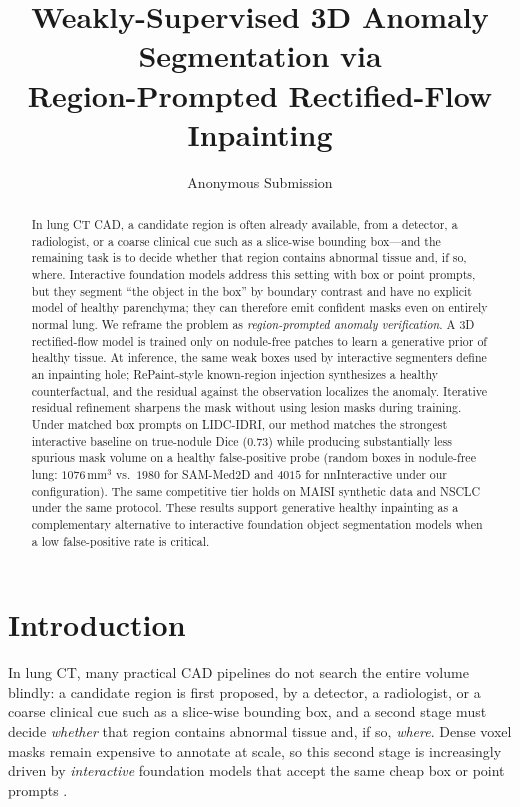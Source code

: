 \documentclass[letterpaper]{article} %
\title{Weakly-Supervised 3D Anomaly Segmentation via\\
       Region-Prompted Rectified-Flow Inpainting}
\author{
    Anonymous Submission
}
\begin{document}
\maketitle

\begin{abstract}
In lung CT CAD, a candidate region is often already available, from a detector, a radiologist, or a coarse clinical cue such as a slice-wise bounding box---and the remaining task is to decide whether that region contains abnormal tissue and, if so, where. Interactive foundation models address this setting with box or point prompts, but they segment ``the object in the box'' by boundary contrast and have no explicit model of healthy parenchyma; they can therefore emit confident masks even on entirely normal lung. We reframe the problem as \emph{region-prompted anomaly verification}. A 3D rectified-flow model is trained only on nodule-free patches to learn a generative prior of healthy tissue. At inference, the same weak boxes used by interactive segmenters define an inpainting hole; RePaint-style known-region injection synthesizes a healthy counterfactual, and the residual against the observation localizes the anomaly. Iterative residual refinement sharpens the mask without using lesion masks during training. Under matched box prompts on LIDC-IDRI, our method matches the strongest interactive baseline on true-nodule Dice (\(0.73\)) while producing substantially less spurious mask volume on a healthy false-positive probe (random boxes in nodule-free lung: \(1076\,\mathrm{mm}^3\) vs.\ \(1980\) for SAM-Med2D and \(4015\) for nnInteractive under our configuration). The same competitive tier holds on MAISI synthetic data and NSCLC under the same protocol. These results support generative healthy inpainting as a complementary alternative to interactive foundation object segmentation models when a low false-positive rate is critical.
\end{abstract}

\section{Introduction}
\label{sec:intro}

In lung CT, many practical CAD pipelines do not search the entire
volume blindly: a candidate region is first proposed, by a
detector, a radiologist, or a coarse clinical cue such as a
slice-wise bounding box, and a second stage must decide
\emph{whether} that region contains abnormal tissue and, if so,
\emph{where}. Dense voxel masks remain expensive to annotate at
scale, so this second stage is increasingly driven by
\emph{interactive} foundation models that accept the same cheap
box or point prompts
\citep{nninteractive2025,segvol2024,sam_med3d2023,medsam2_2025,vista3d2024}.
\end{document}
